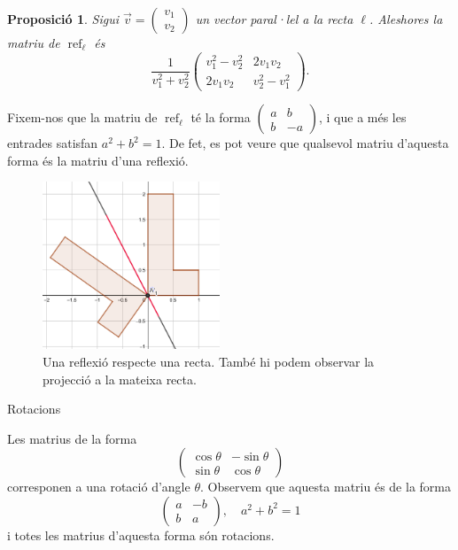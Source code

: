\documentclass[
  11pt,
]{book}
\makeatletter
\numberwithin{dummy}{section}
\theoremstyle{maincolornumbox}
\theoremstyle{blacknumex}
\theoremstyle{blacknumbox}
\theoremstyle{maincolornum}
\newtheorem{propositionT}{Proposició}[chapter]
\newenvironment{proposition}{\begin{pBox}\begin{propositionT}}{\end{propositionT}\end{pBox}}
\renewcommand{\subsection}{\@startsection {subsection}{2}{\z@}
{-3ex \@plus -0.1ex \@minus -.4ex}
{0.5ex \@plus.2ex }
{\normalfont\sffamily\bfseries}}
\newlength\esp
\makeatother
\begin{document}
\begin{proposition}
\protect\hypertarget{prp:reflexio}{}\label{prp:reflexio}Sigui
\(\vec v = \begin{pmatrix}v_1\\v_2\end{pmatrix}\) un vector paral·lel a la
recta \(\ell\). Aleshores la matriu de \(\operatorname{ref}_\ell\) és
\[\frac{1}{v_1^2 + v_2^2}\begin{pmatrix}v_1^2-v_2^2&2v_1v_2\\2v_1v_2&v_2^2-v_1^2\end{pmatrix}.\]
\end{proposition}

Fixem-nos que la matriu de \(\operatorname{ref}_\ell\) té la forma
\(\begin{pmatrix}a&b\\b&-a\end{pmatrix}\), i que a més les entrades
satisfan \(a^2 + b^2 = 1\). De fet, es pot veure que qualsevol matriu
d'aquesta forma és la matriu d'una reflexió.

\begin{figure}
\centering
\includegraphics[width=\textwidth,height=5cm]{reflexio.png}
\caption{Una reflexió respecte una recta. També hi podem observar la projecció
a la mateixa recta.}\label{fig:reflexio}
\end{figure}

\subsection{Rotacions}\label{subsubsec:rotacio}

Les matrius de la forma
\[\begin{pmatrix}
\cos\theta&-\sin\theta\\
\sin\theta&\cos\theta
\end{pmatrix}\] corresponen a una rotació d'angle \(\theta\). Observem
que aquesta matriu és de la forma \[\begin{pmatrix}
a&-b\\b&a
\end{pmatrix},\quad a^2+b^2=1\] i totes les matrius d'aquesta forma són
rotacions.
\end{document}
